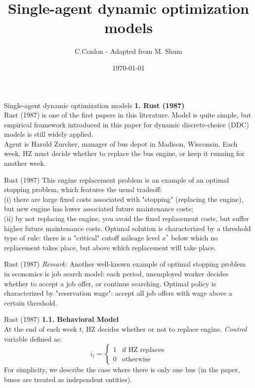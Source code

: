 \documentclass[xcolor=pdftex,dvipsnames,table,mathserif]{beamer}
\title [Single-agent dynamic optimization models]{Single-agent dynamic optimization models}
\author{C.Conlon - Adapted from M. Shum}
\institute{Grad IO }
\date{\today}
\begin{document}
\begin{frame}
\titlepage
\end{frame}


\begin{frame}{Single-agent dynamic optimization models}
\vspace{.5mm}
{\bf 1. Rust (1987)} \\
\vspace{3mm}
Rust (1987) is one of the first papers in this literature. Model is quite simple, but empirical framework introduced in this paper for dynamic discrete-choice (DDC) models is still widely applied.\\
\vspace{3mm}
Agent is Harold Zurcher, manager of bus depot in Madison, Wisconsin. Each week, HZ must decide whether to replace the bus engine, or keep it running for another week. \end{frame}


\begin{frame}{Rust (1987)}
This engine replacement problem is an example of an optimal stopping problem, which features the usual tradeoff:\\
\vspace{3mm}
(i) there are large fixed costs associated with "stopping" (replacing the engine), but new engine has lower associated future maintenance costs;\\
(ii) by not replacing the engine, you avoid the fixed replacement costs, but suffer higher future maintenance costs. Optimal solution is characterized by a threshold type of rule: there is a "critical" cutoff mileage level $x^*$ below which no replacement takes place, but above which replacement will take place.\\
\end{frame}

\begin{frame}{Rust (1987)}
\emph{Remark:} Another well-known example of optimal stopping problem in economics is job search model: each period, unemployed worker decides whether to accept a job offer, or continue searching. Optimal policy is characterized by "reservation wage": accept all job offers with wage above a certain threshold. 
\end{frame}

\begin{frame}{Rust (1987)}
\vspace{.5mm}
{\bf 1.1. Behavioral Model}\\
\vspace{3mm}
At the end of each week $t$, HZ decides whether or not to replace engine. \emph{Control} variable defined as:
\begin{equation*}
i_t = \left \{ \begin{matrix} 1 & \text{if HZ replaces} \\ 0 & \text{otherwise} \end{matrix} \right . 
\end{equation*}
For simplicity, we describe the case where there is only one bus (in the paper, buses are treated as independent entities). \\
\end{frame}
\end{document}
